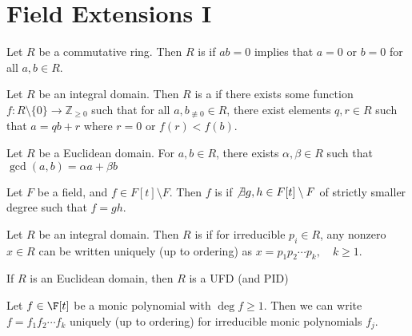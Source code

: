 \documentclass[a4paper]{article}
\begin{document}
\section{Field Extensions I}
\begin{tdefinition}
  Let \(R\) be a commutative ring. Then \(R\) is  if \(ab=0\) implies that \(a=0\) or \(b=0\) for all \(a,b\in R\).
\end{tdefinition}

\begin{tdefinition}
  Let \(R\) be an integral domain. Then \(R\) is a  if there exists some function \(f:R\setminus\{0\}\to \mathbb{Z}_{\geq 0}\) such that for all \(a,b_{\not\equiv 0} \in R\), there exist elements \(q,r\in R\) such that \(a=qb+r\) where \(r=0\) or \(f(r)<f(b)\).
\end{tdefinition}

\begin{ttheorem}
  Let $ R $ be a Euclidean domain. For $ a,b\in R $, there exists $ \alpha,\beta\in R $ such that $ \gcd(a,b) = \alpha a+\beta b $
\end{ttheorem}

\begin{tdefinition}[Irreducible]
  Let \({F}\) be a field, and \(f\in F[t]\setminus F\).
  Then \(f\) is  if \(\not\exists g,h\in F[t]\setminus F\) of strictly smaller degree such that \(f=gh\).
\end{tdefinition}

\begin{tdefinition}
  Let \(R\) be an integral domain.
  Then \(R\) is  if for irreducible \(p_i\in R\), any nonzero \(x\in R\) can be written uniquely (up to ordering) as \(x=p_1p_2\cdots p_k,\quad k\geq 1\).
\end{tdefinition}

\quad If $ R $ is an Euclidean domain, then $ R $ is a UFD (and PID)

\begin{tcorollary}
  Let $ f\in \F[t] $ be a monic polynomial with $ \deg f\geq 1 $.
  Then we can write $ f = f_1f_2\cdots f_k $ uniquely (up to ordering) for irreducible monic polynomials $ f_j $.
\end{tcorollary}
\end{document}
